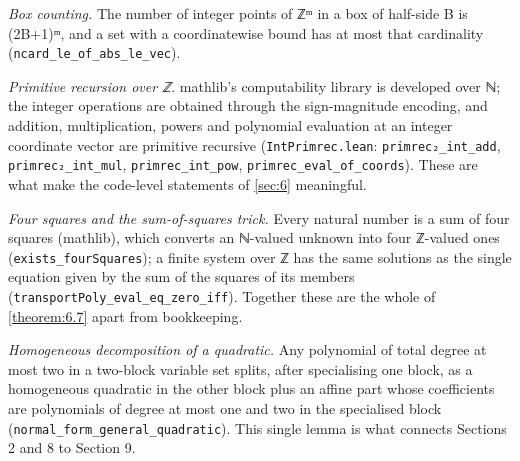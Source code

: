 \documentclass[11pt]{article}
\theoremstyle{plain}
\theoremstyle{definition}
\theoremstyle{remark}
\theoremstyle{plain}
\theoremstyle{definition}
\theoremstyle{remark}
\theoremstyle{plain}
\theoremstyle{definition}
\theoremstyle{remark}
\begin{document}
\emph{Box counting.} The number of integer points of ℤᵐ in a box of half-side B is (2B+1)ᵐ, and a set with a coordinatewise bound has at most that cardinality (\texttt{ncard\_\allowbreak{}le\_\allowbreak{}of\_\allowbreak{}abs\_\allowbreak{}le\_\allowbreak{}vec}).

\emph{Primitive recursion over ℤ.} mathlib's computability library is developed over ℕ; the integer operations are obtained through the sign-magnitude encoding, and addition, multiplication, powers and polynomial evaluation at an integer coordinate vector are primitive recursive (\texttt{IntPrimrec.\allowbreak{}lean}: \texttt{primrec₂\_\allowbreak{}int\_\allowbreak{}add}, \texttt{primrec₂\_\allowbreak{}int\_\allowbreak{}mul}, \texttt{primrec\_\allowbreak{}int\_\allowbreak{}pow}, \texttt{primrec\_\allowbreak{}eval\_\allowbreak{}of\_\allowbreak{}coords}). These are what make the code-level statements of \cref{sec:6} meaningful.

\emph{Four squares and the sum-of-squares trick.} Every natural number is a sum of four squares (mathlib), which converts an ℕ-valued unknown into four ℤ-valued ones (\texttt{exists\_\allowbreak{}fourSquares}); a finite system over ℤ has the same solutions as the single equation given by the sum of the squares of its members (\texttt{transportPoly\_\allowbreak{}eval\_\allowbreak{}eq\_\allowbreak{}zero\_\allowbreak{}iff}). Together these are the whole of \cref{theorem:6.7} apart from bookkeeping.

\emph{Homogeneous decomposition of a quadratic.} Any polynomial of total degree at most two in a two-block variable set splits, after specialising one block, as a homogeneous quadratic in the other block plus an affine part whose coefficients are polynomials of degree at most one and two in the specialised block (\texttt{normal\_\allowbreak{}form\_\allowbreak{}general\_\allowbreak{}quadratic}). This single lemma is what connects Sections 2 and 8 to Section 9.

\end{document}
